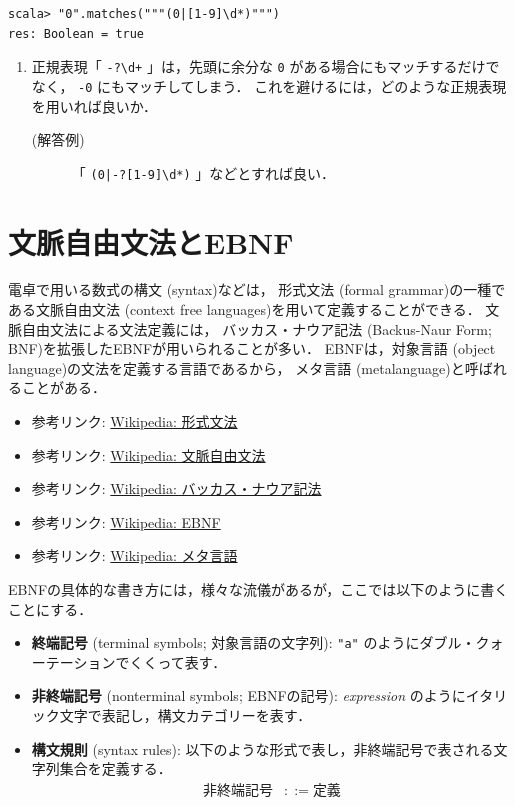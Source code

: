 \documentclass[a4j]{jsarticle}
\begin{document}
\begin{verbatim}
scala> "0".matches("""(0|[1-9]\d*)""")
res: Boolean = true
\end{verbatim}
\begin{enumerate}
\item 正規表現「 \texttt{-?\textbackslash{}d+} 」は，先頭に余分な \texttt{0} がある場合にもマッチするだけでなく，
     \texttt{-0} にもマッチしてしまう．
     これを避けるには，どのような正規表現を用いれば良いか．
\begin{description}
\item[(解答例)] 「 \texttt{(0|-?[1-9]\textbackslash{}d*)} 」などとすれば良い．
\end{description}
\end{enumerate}
\section{文脈自由文法とEBNF}
\label{sec-3}

電卓で用いる数式の構文 (syntax)などは，
形式文法 (formal grammar)の一種である文脈自由文法 (context free languages)を用いて定義することができる．
文脈自由文法による文法定義には，
バッカス・ナウア記法 (Backus-Naur Form; BNF)を拡張したEBNFが用いられることが多い．
EBNFは，対象言語 (object language)の文法を定義する言語であるから，
メタ言語 (metalanguage)と呼ばれることがある．

\begin{itemize}
\item 参考リンク: \href{https://ja.wikipedia.org/wiki/%E5%BD%A2%E5%BC%8F%E6%96%87%E6%B3%95}{Wikipedia: 形式文法}
\item 参考リンク: \href{https://ja.wikipedia.org/wiki/%E6%96%87%E8%84%88%E8%87%AA%E7%94%B1%E6%96%87%E6%B3%95}{Wikipedia: 文脈自由文法}
\item 参考リンク: \href{https://ja.wikipedia.org/wiki/%E3%83%90%E3%83%83%E3%82%AB%E3%82%B9%E3%83%BB%E3%83%8A%E3%82%A6%E3%82%A2%E8%A8%98%E6%B3%95}{Wikipedia: バッカス・ナウア記法}
\item 参考リンク: \href{https://ja.wikipedia.org/wiki/EBNF}{Wikipedia: EBNF}
\item 参考リンク: \href{https://ja.wikipedia.org/wiki/%E3%83%A1%E3%82%BF%E8%A8%80%E8%AA%9E}{Wikipedia: メタ言語}
\end{itemize}

EBNFの具体的な書き方には，様々な流儀があるが，ここでは以下のように書くことにする．

\begin{itemize}
\item \textbf{終端記号} (terminal symbols; 対象言語の文字列): 
    \texttt{"a"} のようにダブル・クォーテーションでくくって表す．
\item \textbf{非終端記号} (nonterminal symbols; EBNFの記号): 
    \emph{expression} のようにイタリック文字で表記し，構文カテゴリーを表す．
\item \textbf{構文規則} (syntax rules): 
    以下のような形式で表し，非終端記号で表される文字列集合を定義する．
    \begin{align*}
    \mbox{非終端記号} & ::= \mbox{定義}
    \end{align*}
\end{itemize}
\end{document}
